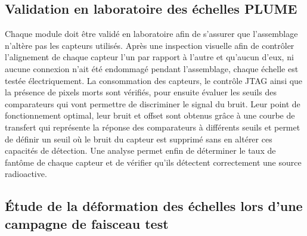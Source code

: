 \documentclass[a4papper, 10pt]{article}
\begin{document}
   \subsection{Validation en laboratoire des échelles PLUME}

  Chaque module doit être validé en laboratoire afin de s'assurer que l'assemblage n'altère pas les capteurs utilisés.
  Après une inspection visuelle afin de contrôler l'alignement de chaque capteur l'un par rapport à l'autre et qu'aucun d'eux, ni aucune connexion n'ait été endommagé pendant l'assemblage, chaque échelle est testée électriquement.
  La consommation des capteurs, le contrôle JTAG ainsi que la présence de pixels morts sont vérifiés, pour ensuite évaluer les seuils des comparateurs qui vont permettre de discriminer le signal du bruit.
  Leur point de fonctionnement optimal, leur bruit et offset sont obtenus grâce à une courbe de transfert qui représente la réponse des comparateurs à différents seuils et permet de définir un seuil où le bruit du capteur est supprimé sans en altérer ces capacités de détection.
  Une analyse permet enfin de déterminer le taux de fantôme de chaque capteur et de vérifier qu'ils détectent correctement une source radioactive.
  
    \subsection{Étude de la déformation des échelles lors d'une campagne de faisceau test}
\end{document}

